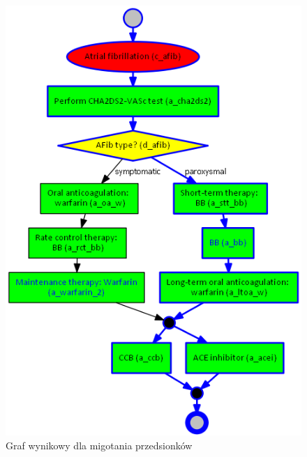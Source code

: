 \begin{figure}[H]
\centering
\includegraphics[scale=0.45]{img/rozwiazanie1afib-ver-4.png}
\caption{Graf wynikowy dla migotania przedsionków}
\label{fig:rozw_afib}
\end{figure}

